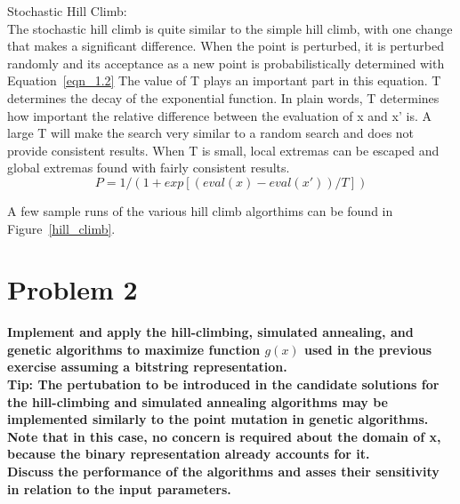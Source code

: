 Stochastic Hill Climb: \\

The stochastic hill climb is quite similar to the simple hill climb, with one change that makes a significant difference. When the point is perturbed, it is perturbed randomly and its acceptance as a new point is probabilistically determined with Equation~\ref{eqn_1.2} The value of T plays an important part in this equation. T determines the decay of the exponential function. In plain words, T determines how important the relative difference between the evaluation of x and x' is. A large T will make the search very similar to a random search and does not provide consistent results. When T is small, local extremas can be escaped and global extremas found with fairly consistent results.  \\

\begin{equation}\label{eqn_1.2}
P = 1 / ( 1 + exp[ ( eval(x) - eval(x') ) / T ] )
\end{equation}

A few sample runs of the various hill climb algorthims can be found in Figure~\ref{hill_climb}.




\newpage
\section{Problem 2}
\textbf{Implement and apply the hill-climbing, simulated annealing, and genetic algorithms to maximize function $g(x)$ used in the previous exercise assuming a bitstring representation.} \newline \\
\textbf{Tip: The pertubation to be introduced in the candidate solutions for the hill-climbing and simulated annealing algorithms may be implemented similarly to the point mutation in genetic algorithms. Note that in this case, no concern is required about the domain of x, because the binary representation already accounts for it.} \newline \\
\textbf{Discuss the performance of the algorithms and asses their sensitivity in relation to the input parameters.}


